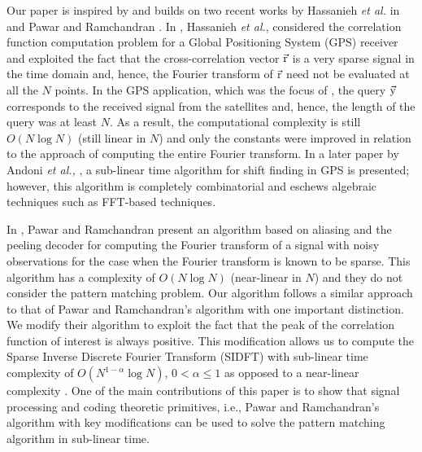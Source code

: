 Our paper is inspired by and builds on two recent works by Hassanieh {\em {et al.}} in \cite{hassanieh2012faster} and Pawar and Ramchandran \cite{pawar2014robust}. In \cite{hassanieh2012faster}, Hassanieh \emph{et al.}, considered the correlation function computation problem for a Global Positioning System (GPS) receiver and exploited the fact that the cross-correlation vector $\vec{\mathrm{r}}$ is a very sparse signal in the time domain and, hence, the Fourier transform of $\vec{\mathrm{r}}$ need not be evaluated at all the $N$ points. In the GPS application, which was the focus of \cite{hassanieh2012faster}, the query $\vec{\mathrm{y}}$ corresponds to the received signal from the satellites and, hence, the length of the query was at least $N$. As a result, the computational complexity is still $O(N \log N)$ (still linear in $N$) and only the constants were improved in relation to the approach of computing the entire Fourier transform. In a later paper by Andoni {\em et al.,} \cite{andoni2013shift}, a sub-linear time algorithm for shift finding in GPS is presented; however, this algorithm is completely combinatorial and eschews algebraic techniques such as FFT-based techniques.

In \cite{pawar2014robust}, Pawar and Ramchandran present an algorithm based on aliasing and the peeling decoder for computing the Fourier transform of a signal with noisy observations for the case when the Fourier transform is known to be sparse. This algorithm has a complexity of $O(N \log N)$ (near-linear in $N$) and they do not consider the pattern matching problem. Our algorithm follows a similar approach to that of Pawar and Ramchandran's algorithm with one important distinction. We modify their algorithm to exploit the fact that the peak of the correlation function of interest is always positive. This modification allows us to compute the Sparse Inverse Discrete Fourier Transform (SIDFT) with sub-linear time complexity of $O(N^{1-\alpha} \log N)$, $0 < \alpha \leq 1$ as opposed to a near-linear complexity . One of the main contributions of this paper is to show that signal processing and coding theoretic primitives, i.e., Pawar and Ramchandran's algorithm with key modifications can be used to solve the pattern matching algorithm in sub-linear time.
